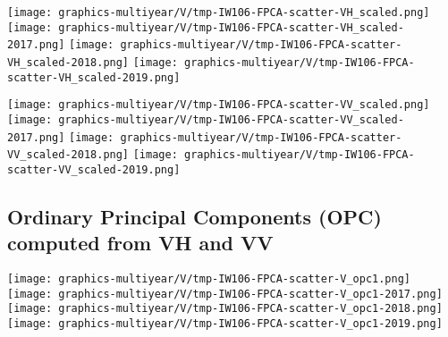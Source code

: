 \begin{center}
\begin{minipage}{7.0in}
\texttt{[image: graphics-multiyear/V/tmp-IW106-FPCA-scatter-VH\_scaled.png]}
\quad
\texttt{[image: graphics-multiyear/V/tmp-IW106-FPCA-scatter-VH\_scaled-2017.png]}
\vskip 1.0cm
\texttt{[image: graphics-multiyear/V/tmp-IW106-FPCA-scatter-VH\_scaled-2018.png]}
\quad
\texttt{[image: graphics-multiyear/V/tmp-IW106-FPCA-scatter-VH\_scaled-2019.png]}
\end{minipage}
\end{center}


\clearpage
\begin{center}
\begin{minipage}{7.0in}
\texttt{[image: graphics-multiyear/V/tmp-IW106-FPCA-scatter-VV\_scaled.png]}
\quad
\texttt{[image: graphics-multiyear/V/tmp-IW106-FPCA-scatter-VV\_scaled-2017.png]}
\vskip 1.0cm
\texttt{[image: graphics-multiyear/V/tmp-IW106-FPCA-scatter-VV\_scaled-2018.png]}
\quad
\texttt{[image: graphics-multiyear/V/tmp-IW106-FPCA-scatter-VV\_scaled-2019.png]}
\end{minipage}
\end{center}


\clearpage

\subsection{Ordinary Principal Components (OPC) computed from VH and VV}
\label{FPCA-scatter-opc-IW106}

\begin{center}
\begin{minipage}{7.0in}
\texttt{[image: graphics-multiyear/V/tmp-IW106-FPCA-scatter-V\_opc1.png]}
\quad
\texttt{[image: graphics-multiyear/V/tmp-IW106-FPCA-scatter-V\_opc1-2017.png]}
\vskip 1.0cm
\texttt{[image: graphics-multiyear/V/tmp-IW106-FPCA-scatter-V\_opc1-2018.png]}
\quad
\texttt{[image: graphics-multiyear/V/tmp-IW106-FPCA-scatter-V\_opc1-2019.png]}
\end{minipage}
\end{center}


